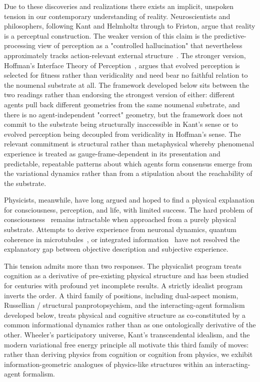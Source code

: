 \documentclass[11pt]{article}
\begin{document}
Due to these discoveries and realizations there exists an implicit, unspoken tension in our contemporary understanding of reality. Neuroscientists and philosophers, following Kant and Helmholtz through to Friston, argue that reality is a perceptual construction. The weaker version of this claim is the predictive-processing view of perception as a "controlled hallucination" that nevertheless approximately tracks action-relevant external structure~\cite{Clark2016, Seth2021}. The stronger version, Hoffman's Interface Theory of Perception~\cite{Hoffman2019}, argues that evolved perception is selected for fitness rather than veridicality and need bear no faithful relation to the noumenal substrate at all. The framework developed below sits between the two readings rather than endorsing the strongest version of either: different agents pull back different geometries from the same noumenal substrate, and there is no agent-independent "correct" geometry, but the framework does not commit to the substrate being structurally inaccessible in Kant's sense or to evolved perception being decoupled from veridicality in Hoffman's sense. The relevant commitment is structural rather than metaphysical whereby phenomenal experience is treated as gauge-frame-dependent in its presentation and predictable, repeatable patterns about which agents form consensus emerge from the variational dynamics rather than from a stipulation about the reachability of the substrate.

Physicists, meanwhile, have long argued and hoped to find a physical explanation for consciousness, perception, and life, with limited success. The hard problem of consciousness~\cite{Chalmers1995} remains intractable when approached from a purely physical substrate. Attempts to derive experience from neuronal dynamics, quantum coherence in microtubules~\cite{HameroffPenrose1996}, or integrated information~\cite{Tononi2008} have not resolved the explanatory gap between objective description and subjective experience.

This tension admits more than two responses. The physicalist program treats cognition as a derivative of pre-existing physical structure and has been studied for centuries with profound yet incomplete results. A strictly idealist program inverts the order. A third family of positions, including dual-aspect monism, Russellian / structural panprotopsychism, and the interacting-agent formalism developed below, treats physical and cognitive structure as co-constituted by a common informational dynamics rather than as one ontologically derivative of the other. Wheeler's participatory universe, Kant's transcendental idealism, and the modern variational free energy principle all motivate this third family of moves: rather than deriving physics from cognition or cognition from physics, we exhibit information-geometric analogues of physics-like structures within an interacting-agent formalism.
\end{document}
